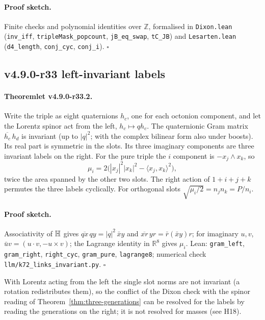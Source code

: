 \paragraph{Proof sketch.}
Finite checks and polynomial identities over \(\mathbb Z\), formalised in \texttt{Dixon.lean} (\texttt{inv\_iff},
\texttt{tripleMask\_popcount}, \texttt{jB\_eq\_swap}, \texttt{tC\_JB}) and \texttt{Lesarten.lean} (\texttt{d4\_length},
\texttt{conj\_cyc}, \texttt{conj\_i}).  \(\square\)

\subsection*{v4.9.0-r33 left-invariant labels}
\label{subsec:v490-r33-labels}

\paragraph{Theoremlet v4.9.0-r33.2.}
Write the triple as eight quaternions \(h_c\), one for each octonion component, and let the Lorentz spinor act from the
left, \(h_c\mapsto qh_c\).  The quaternionic Gram matrix \(\overline{h_c}\,h_d\) is invariant (up to \(|q|^2\); with the complex
bilinear form also under boosts).  Its real part is symmetric in the slots.  Its three imaginary components are three
invariant labels on the right.  For the pure triple the \(i\) component is \(-x_j\wedge x_k\), so
\[
\mu_i=2\bigl(|x_j|^2|x_k|^2-\langle x_j,x_k\rangle^2\bigr),
\]
twice the area spanned by the other two slots.  The right action of \(1+i+j+k\) permutes the three labels cyclically.  For
orthogonal slots \(\sqrt{\mu_i/2}=n_jn_k=P/n_i\).

\paragraph{Proof sketch.}
Associativity of \(\mathbb{H}\) gives \(\overline{qx}\,qy=|q|^2\,\bar x y\) and \(\overline{xr}\,yr=\bar r(\bar xy)r\); for imaginary
\(u,v\), \(\bar uv=(u\cdot v,-u\times v)\); the Lagrange identity in \(\mathbb R^8\) gives \(\mu_i\).  Lean: \texttt{gram\_left},
\texttt{gram\_right}, \texttt{right\_cyc}, \texttt{gram\_pure}, \texttt{lagrange8}; numerical check
\texttt{llm/k72\_links\_invariant.py}.  \(\square\)

\noindent With Lorentz acting from the left the single slot norms are not invariant (a rotation redistributes them), so the
conflict of the Dixon check with the spinor reading of Theorem~\ref{thm:three-generations} can be resolved for the labels by
reading the generations on the right; it is not resolved for masses (see H18).

